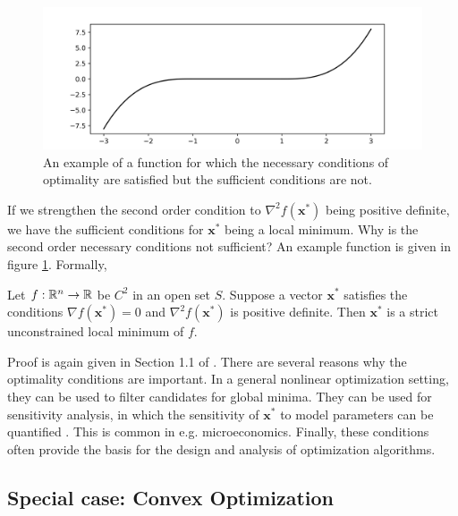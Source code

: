 \begin{figure}[t]
    \centering
    \includegraphics[width=0.7\linewidth]{figs/foc.png}
    \caption{An example of a function for which the necessary conditions of optimality are satisfied but the sufficient conditions are not.}
    \label{fig:foc}
\end{figure}


If we strengthen the second order condition to $\nabla^2 f(\bm{x}^*)$ being positive definite, we have the sufficient conditions for $\bm{x}^*$ being a local minimum. Why is the second order necessary conditions not sufficient? An example function is given in figure \ref{fig:foc}. Formally, 

\begin{theorem}
Let $f:\mathbb{R}^n \to \mathbb{R}$ be $C^2$ in an open set $S$. Suppose a vector $\bm{x}^*$ satisfies the conditions $\nabla f(\bm{x}^*) = 0$ and $\nabla^2 f(\bm{x}^*)$ is positive definite. Then $\bm{x}^*$ is a strict unconstrained local minimum of $f$. 
\end{theorem}

Proof is again given in Section 1.1 of \cite{bertsekas2016nonlinear}.
There are several reasons why the optimality conditions are important. In a general nonlinear optimization setting, they can be used to filter candidates for global minima. They can be used for sensitivity analysis, in which the sensitivity of $\bm{x}^*$ to model parameters can be quantified \cite{bertsekas2016nonlinear}. This is common in e.g. microeconomics. Finally, these conditions often provide the basis for the design and analysis of optimization algorithms.

\subsection{Special case: Convex Optimization}

